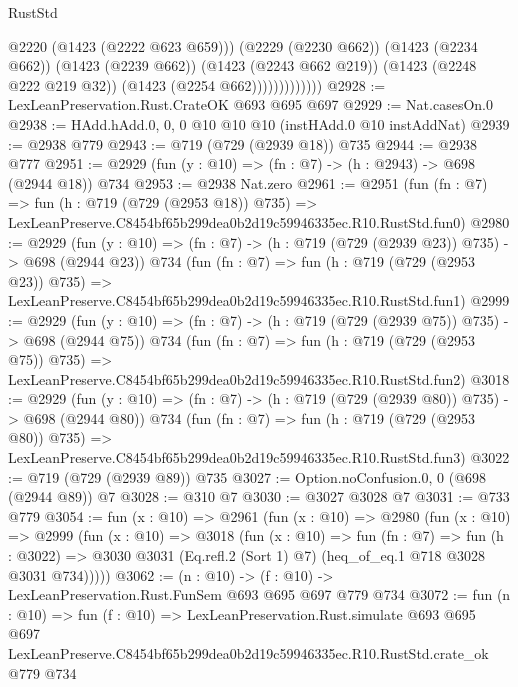 \begin{lexlean}{RustStd}
\begin{coremodule}
                            @2220
                            (@1423 (@2222 @623 @659)))
                          (@2229 (@2230 @662))
                          (@1423 (@2234 @662))
                          (@1423 (@2239 @662))
                          (@1423 (@2243 @662 @219))
                          (@1423 (@2248 @222 @219 @32))
                          (@1423 (@2254 @662)))))))))))))
@2928 := LexLeanPreservation.Rust.CrateOK @693 @695 @697
@2929 := Nat.casesOn.{0}
@2938 := HAdd.hAdd.{0, 0, 0} @10 @10 @10 (instHAdd.{0} @10 instAddNat)
@2939 := @2938 @779
@2943 := @719 (@729 (@2939 @18)) @735
@2944 := @2938 @777
@2951 := @2929 (fun (y : @10) => (fn : @7) -> (h : @2943) -> @698 (@2944 @18)) @734
@2953 := @2938 Nat.zero
@2961 := @2951
    (fun (fn : @7) =>
    fun (h : @719 (@729 (@2953 @18)) @735) =>
    LexLeanPreserve.C8454bf65b299dea0b2d19c59946335ec.R10.RustStd.fun0)
@2980 := @2929
    (fun (y : @10) => (fn : @7) -> (h : @719 (@729 (@2939 @23)) @735) -> @698 (@2944 @23))
    @734
    (fun (fn : @7) =>
    fun (h : @719 (@729 (@2953 @23)) @735) =>
    LexLeanPreserve.C8454bf65b299dea0b2d19c59946335ec.R10.RustStd.fun1)
@2999 := @2929
    (fun (y : @10) => (fn : @7) -> (h : @719 (@729 (@2939 @75)) @735) -> @698 (@2944 @75))
    @734
    (fun (fn : @7) =>
    fun (h : @719 (@729 (@2953 @75)) @735) =>
    LexLeanPreserve.C8454bf65b299dea0b2d19c59946335ec.R10.RustStd.fun2)
@3018 := @2929
    (fun (y : @10) => (fn : @7) -> (h : @719 (@729 (@2939 @80)) @735) -> @698 (@2944 @80))
    @734
    (fun (fn : @7) =>
    fun (h : @719 (@729 (@2953 @80)) @735) =>
    LexLeanPreserve.C8454bf65b299dea0b2d19c59946335ec.R10.RustStd.fun3)
@3022 := @719 (@729 (@2939 @89)) @735
@3027 := Option.noConfusion.{0, 0} (@698 (@2944 @89)) @7
@3028 := @310 @7
@3030 := @3027 @3028 @7
@3031 := @733 @779
@3054 := fun (x : @10) =>
  @2961
    (fun (x : @10) =>
    @2980
      (fun (x : @10) =>
      @2999
        (fun (x : @10) =>
        @3018
          (fun (x : @10) =>
          fun (fn : @7) =>
          fun (h : @3022) =>
          @3030 @3031 (Eq.refl.{2} (Sort 1) @7) (heq_of_eq.{1} @718 @3028 @3031 @734)))))
@3062 := (n : @10) -> (f : @10) -> LexLeanPreservation.Rust.FunSem @693 @695 @697 @779 @734
@3072 := fun (n : @10) =>
  fun (f : @10) =>
  LexLeanPreservation.Rust.simulate
    @693
    @695
    @697
    LexLeanPreserve.C8454bf65b299dea0b2d19c59946335ec.R10.RustStd.crate_ok
    @779
    @734
\end{coremodule}
\end{lexlean}
